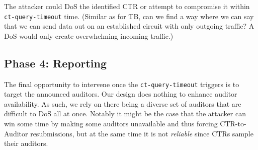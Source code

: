 The attacker could DoS the identified CTR or attempt to compromise it within
\texttt{ct-query-timeout} time. (Similar as for TB, can we find a way where we
can say that we can send data out on an established circuit with only outgoing
traffic? A DoS would only create overwhelming incoming traffic.)

\subsection{Phase 4: Reporting} \label{sec:security:phase4}
The final opportunity to intervene once the \texttt{ct-query-timeout} triggers
is to target the announced auditors.  Our design does nothing to enhance auditor
availability.  As such, we rely on there being a diverse set of auditors that
are difficult to DoS all at once.  Notably it might be the case that the
attacker can win some time by making some auditors unavailable and thus forcing
CTR-to-Auditor resubmissions, but at the same time it is not \emph{reliable}
since CTRs sample their auditors.
